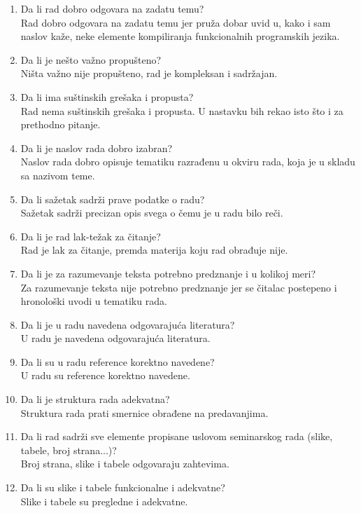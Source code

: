 \documentclass[a4paper]{report}
\begin{document}
\begin{enumerate}
\item Da li rad dobro odgovara na zadatu temu?\\
Rad dobro odgovara na zadatu temu jer pruža dobar uvid u, kako i sam naslov kaže, neke elemente kompiliranja funkcionalnih programskih jezika.
\item Da li je nešto važno propušteno?\\
Ništa važno nije propušteno, rad je kompleksan i sadržajan.
\item Da li ima suštinskih grešaka i propusta?\\
Rad nema suštinskih grešaka i propusta. U nastavku bih rekao isto što i za prethodno pitanje.
\item Da li je naslov rada dobro izabran?\\
Naslov rada dobro opisuje tematiku razrađenu u okviru rada, koja je u skladu sa nazivom teme.
\item Da li sažetak sadrži prave podatke o radu?\\
Sažetak sadrži precizan opis svega o čemu je u radu bilo reči.
\item Da li je rad lak-težak za čitanje?\\
Rad je lak za čitanje, premda materija koju rad obrađuje nije.
\item Da li je za razumevanje teksta potrebno predznanje i u kolikoj meri?\\
Za razumevanje teksta nije potrebno predznanje jer se čitalac postepeno i hronološki uvodi u tematiku rada.
\item Da li je u radu navedena odgovarajuća literatura?\\
U radu je navedena odgovarajuća literatura.
\item Da li su u radu reference korektno navedene?\\
U radu su reference korektno navedene.
\item Da li je struktura rada adekvatna?\\
Struktura rada prati smernice obrađene na predavanjima.
\item Da li rad sadrži sve elemente propisane uslovom seminarskog rada (slike, tabele, broj strana...)?\\
Broj strana, slike i tabele odgovaraju zahtevima.
\item Da li su slike i tabele funkcionalne i adekvatne?\\
Slike i tabele su pregledne i adekvatne.
\end{enumerate}
\end{document}
